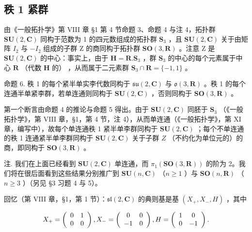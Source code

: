 \subsection{秩 1 紧群}

由《一般拓扑学》第 VIII 章 §1 第 4 节命题 3、命题 4 与注 4，拓扑群 \(\mathbf{SU}(2,\mathbf{C})\) 同构于范数为 1 的四元数组成的拓扑群 \(\mathbf{S}_3\) ，且 \(\mathbf{SU}(2,\mathbf{C})\) 关于由矩阵 \(I_2\) 与 \(-I_2\) 组成的子群 Z 的商同构于拓扑群 \(\mathbf{SO}(3,\mathbf{R})\) 。注意 Z 是 \(\mathbf{SU}(2,\mathbf{C})\) 的中心：事实上，由于 \(\mathbf{H} = \mathbf{R}.\mathbf{S}_3\) ，群 \(\mathbf{S}_3\) 的中心的每个元素属于中心 \(\mathbf{R}\) （代数 \(\mathbf{H}\) 的） ，从而属于二元素群 \(\mathbf{S}_3 \cap \mathbf{R} = \{-1,1\}\) 。

命题 6. 秩 1 的每个紧半单实李代数同构于 \(\mathfrak{su}(2,\mathbf{C})\) 与 \(\mathfrak{o}(3,\mathbf{R})\) 。秩 1 的每个连通半单紧李群，若单连通则同构于 \(\mathbf{SU}(2,\mathbf{C})\) ，否则同构于 \(\mathbf{SO}(3,\mathbf{R})\) 。

第一个断言由命题 4 的推论与命题 5 得出。由于 \(\mathbf{SU}(2,\mathbf{C})\) 同胚于 \(\mathbf{S}_3\) （《一般拓扑学》，第 VIII 章，§1，第 4 节，注 4），从而单连通（《一般拓扑学》，第 XI 章，编写中），故每个单连通秩 1 紧半单李群同构于 \(\mathbf{SU}(2,\mathbf{C})\) ；每个不单连通的秩 1 连通紧半单李群同构于 \(\mathbf{SU}(2,\mathbf{C})\) 关于子群 \(Z\) （不约化为单位元的）的商，即同构于 \(\mathbf{SO}(3,\mathbf{R})\) 。

注. 我们在上面已经看到 \(\mathbf{SU}(2,\mathbf{C})\) 单连通，而 \(\pi_{1}(\mathbf{SO}(3,\mathbf{R}))\) 的阶为 2。我们将在很后面看到这些结果分别推广到 \(\mathbf{SU}(n,\mathbf{C})\) （\(n\geq1\) ）与 \(\mathbf{SO}(n,\mathbf{R})\) （\(n\geq3\) ）（另见 §3 习题 4 与 5）。

回忆（第 VIII 章，§1，第 1 节）：\(\mathfrak{sl}(2,\mathbf{C})\) 的典则基是基 \((X_{+},X_{-},H)\) ，其中

\[
X _ {+} = \left( \begin{array}{c c} 0 & 1 \\ 0 & 0 \end{array} \right), X _ {-} = \left( \begin{array}{c c} 0 & 0 \\ - 1 & 0 \end{array} \right), H = \left( \begin{array}{c c} 1 & 0 \\ 0 & - 1 \end{array} \right).
\]

